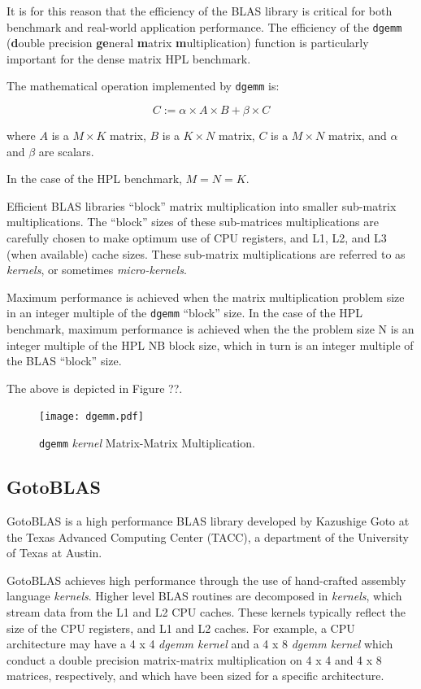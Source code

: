 \documentclass{report}
\begin{document}
It is for this reason that the efficiency of the BLAS library is critical for both benchmark and real-world application performance. The efficiency of the \verb|dgemm| (\textbf{d}ouble precision \textbf{ge}neral \textbf{m}atrix \textbf{m}ultiplication) function is particularly important for the dense matrix HPL benchmark.

The mathematical operation implemented by \verb|dgemm| is:

\[C := \alpha \times A \times B + \beta \times C\]

where $A$ is a $M \times K$ matrix, $B$ is a $K \times N$ matrix, $C$ is a $M \times N$ matrix, and $\alpha$ and $\beta$ are scalars.

In the case of the HPL benchmark, $M = N = K$.

Efficient BLAS libraries ``block'' matrix multiplication into smaller sub-matrix multiplications. The ``block'' sizes of these sub-matrices multiplications are carefully chosen to make optimum use of CPU registers, and L1, L2, and L3 (when available) cache sizes. These sub-matrix multiplications are referred to as \emph{kernels}, or sometimes \emph{micro-kernels}.

Maximum performance is achieved when the matrix multiplication problem size in an integer multiple of the \verb|dgemm| ``block'' size. In the case of the HPL benchmark, maximum performance is achieved when the the problem size N is an integer multiple of the HPL NB block size, which in turn is an integer multiple of the BLAS ``block'' size.

The above is depicted in Figure ??.

\begin{figure}
	\centering
	\texttt{[image: dgemm.pdf]}
	\caption{\texttt{dgemm} \emph{kernel} Matrix-Matrix Multiplication.}
	\label{fig:image2}
\end{figure}


%
%
\subsection{GotoBLAS}

GotoBLAS is a high performance BLAS library developed by Kazushige Goto at the Texas Advanced Computing Center (TACC), a department of the University of Texas at Austin.

GotoBLAS achieves high performance through the use of hand-crafted assembly language \emph{kernels}. Higher level BLAS routines are decomposed in \emph{kernels}, which stream data from the L1 and L2 CPU caches. These kernels typically reflect the size of the CPU registers, and L1 and L2 caches. For example, a CPU architecture may have a 4 x 4 \emph{dgemm kernel} and a 4 x 8 \emph{dgemm kernel} which conduct a double precision matrix-matrix multiplication on 4 x 4 and 4 x 8 matrices, respectively, and which have been sized for a specific architecture.
\end{document}
